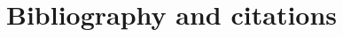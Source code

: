 \documentclass[11pt,a4paper]{article}
\begin{document}
\section{Bibliography and citations}







%
%

\end{document}
